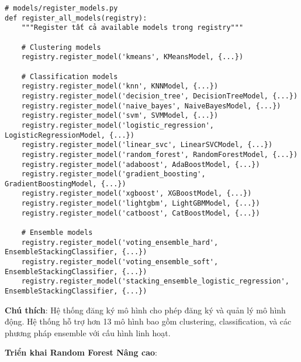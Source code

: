 \begin{verbatim}
# models/register_models.py
def register_all_models(registry):
    """Register tất cả available models trong registry"""
    
    # Clustering models
    registry.register_model('kmeans', KMeansModel, {...})
    
    # Classification models  
    registry.register_model('knn', KNNModel, {...})
    registry.register_model('decision_tree', DecisionTreeModel, {...})
    registry.register_model('naive_bayes', NaiveBayesModel, {...})
    registry.register_model('svm', SVMModel, {...})
    registry.register_model('logistic_regression', LogisticRegressionModel, {...})
    registry.register_model('linear_svc', LinearSVCModel, {...})
    registry.register_model('random_forest', RandomForestModel, {...})
    registry.register_model('adaboost', AdaBoostModel, {...})
    registry.register_model('gradient_boosting', GradientBoostingModel, {...})
    registry.register_model('xgboost', XGBoostModel, {...})
    registry.register_model('lightgbm', LightGBMModel, {...})
    registry.register_model('catboost', CatBoostModel, {...})
    
    # Ensemble models
    registry.register_model('voting_ensemble_hard', EnsembleStackingClassifier, {...})
    registry.register_model('voting_ensemble_soft', EnsembleStackingClassifier, {...})
    registry.register_model('stacking_ensemble_logistic_regression', EnsembleStackingClassifier, {...})
\end{verbatim}

\textbf{Chú thích}: Hệ thống đăng ký mô hình cho phép đăng ký và quản lý mô hình động. Hệ thống hỗ trợ hơn 13 mô hình bao gồm clustering, classification, và các phương pháp ensemble với cấu hình linh hoạt.

\textbf{Triển khai Random Forest Nâng cao}:

